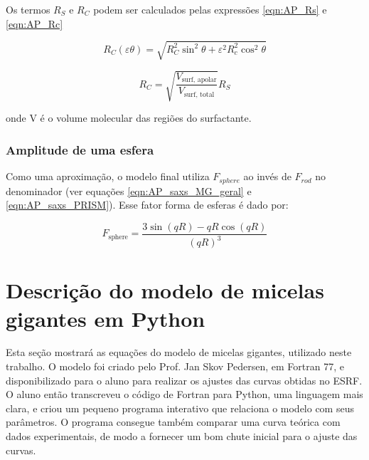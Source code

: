 \begin{apendicesenv}
Os termos \(R_S\) e \(R_C\) podem ser calculados pelas expressões \ref{eqn:AP_Rs} e \ref{eqn:AP_Rc}

\begin{equation}
R_C(\varepsilon\theta) = \sqrt{R_C^2\sin^2\theta + \varepsilon^2R_c^2\cos^2\theta}
\label{eqn:AP_Rc}
\end{equation}

\begin{equation}
R_C = \sqrt{\frac{V_{\textrm{surf, apolar}}}{V_{\textrm{surf, total}}}}R_S
\label{eqn:AP_Rs}
\end{equation}

\noindent onde V é o volume molecular das regiões do surfactante.

\subsection{Amplitude de uma esfera}
Como uma aproximação, o modelo final utiliza \(F_{sphere}\) ao invés de \(F_{rod}\) no denominador (ver equações \ref{eqn:AP_saxs_MG_geral} e \ref{eqn:AP_saxs_PRISM}). Esse fator forma de esferas é dado por:

\begin{equation}
	F_{\textrm{sphere}} = \dfrac{3\sin(qR) - qR\cos(qR)}{(qR)^3}
	\label{eqn:AP_Fsphere}
\end{equation}


\chapter{Descrição do modelo de micelas gigantes em Python}
\label{sec:modelo_MG_python}
Esta seção mostrará as equações do modelo de micelas gigantes, utilizado neste trabalho. O modelo foi criado pelo Prof. Jan Skov Pedersen, em Fortran 77, e disponibilizado para o aluno para realizar os ajustes das curvas obtidas no ESRF. O aluno então transcreveu o código de Fortran para Python, uma linguagem mais clara, e criou um pequeno programa interativo que relaciona o modelo com seus parâmetros. O programa consegue também comparar uma curva teórica com dados experimentais, de modo a fornecer um bom chute inicial para o ajuste das curvas.


\end{apendicesenv}
